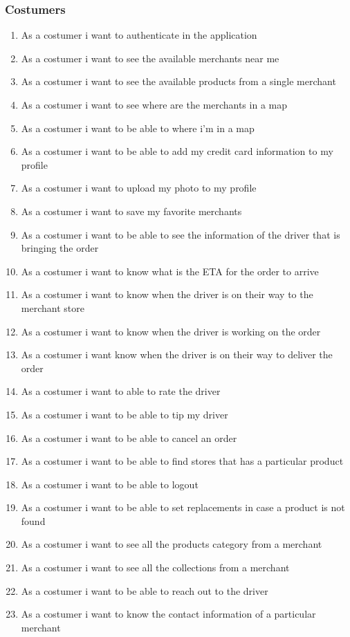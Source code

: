 \subsubsection{Costumers}
\begin{enumerate}[resume, label=USR-\arabic*]
    \item As a costumer i want to authenticate in the application
    \item As a costumer i want to see the available merchants near me
    \item As a costumer i want to see the available products from a single 
    merchant
    \item As a costumer i want to see where are the merchants in a map
    \item As a costumer i want to be able to where i’m in a map
    \item As a costumer i want to be able to add my credit card information 
    to my profile
    \item As a costumer i want to upload my photo to my profile
    \item As a costumer i want to save my favorite merchants
    \item As a costumer i want to be able to see the information of the driver 
    that is bringing the order
    \item As a costumer i want to know what is the ETA for the order to arrive
    \item As a costumer i want to know when the driver is on their way to the 
    merchant store
    \item As a costumer i want to know when the driver is working on the order
    \item As a costumer i want know when the driver is on their way to deliver 
    the order
    \item As a costumer i want to able to rate the driver
    \item As a costumer i want to be able to tip my driver
    \item As a costumer i want to be able to cancel an order
    \item As a costumer i want to be able to find stores that has a particular 
    product
    \item As a costumer i want to be able to logout
    \item As a costumer i want to be able to set replacements in case a 
    product is not found
    \item As a costumer i want to see all the products category from a merchant
    \item As a costumer i want to see all the collections from a merchant
    \item As a costumer i want to be able to reach out to the driver
    \item As a costumer i want to know the contact information of a 
    particular merchant
\end{enumerate}
